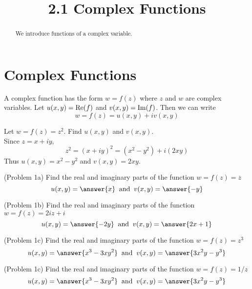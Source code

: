 \documentclass[handout]{ximera}
\title{2.1 Complex Functions}
\begin{document}
\begin{abstract}
We introduce functions of a complex variable.
\end{abstract}

\maketitle

\section{Complex Functions}

A complex function has the form $w = f(z)$ where $z$ and $w$ are complex variables.
Let $u(x,y) = \operatorname{Re}(f)$ and $v(x,y) = \operatorname{Im}(f)$. Then we can write 
\[
w = f(z) = u(x,y) + iv(x,y)
\]



\begin{example}[Example 1] 
Let $w = f(z) = z^2$. Find $u(x,y)$ and $v(x,y)$.\\
Since $z = x+iy$, 
\[
z^2 = (x+iy)^2 = \left(x^2 - y^2\right) + i(2xy)
\]
Thus $u(x,y) = x^2 - y^2$ and $v(x,y) = 2xy$.

\end{example}




\begin{problem}(Problem 1a)
Find the real and imaginary parts of the function $w = f(z) = \overline{z}$
\[
u(x,y) = \answer{x} \;\; \mbox{and} \;\; v(x,y) = \answer{-y}
\]

\end{problem}


\begin{problem}(Problem 1b)
Find the real and imaginary parts of the function $w = f(z) = 2iz+i$     
\[
u(x,y) = \answer{-2y} \;\; \mbox{and} \;\; v(x,y) = \answer{2x+1}
\]

\end{problem}


\begin{problem}(Problem 1c)
Find the real and imaginary parts of the function $w = f(z) = z^3$   
\[
u(x,y) = \answer{x^3 - 3xy^2} \;\; \mbox{and} \;\; v(x,y) = \answer{3x^2y -y^3}
\]

\end{problem}

\begin{problem}(Problem 1c)
Find the real and imaginary parts of the function $w = f(z) = 1/z$   
\[
u(x,y) = \answer{x^3 - 3xy^2} \;\; \mbox{and} \;\; v(x,y) = \answer{3x^2y -y^3}
\]

\end{problem}
\end{document}

